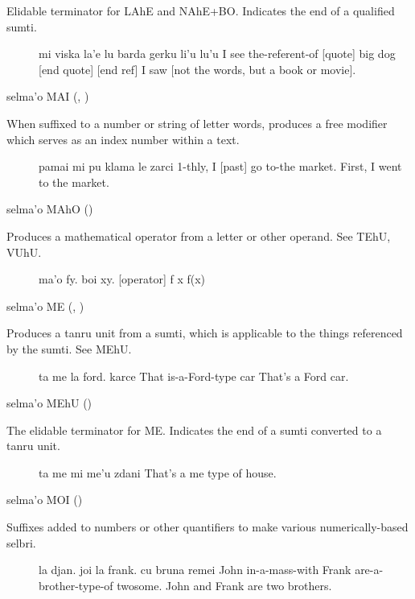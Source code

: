 Elidable terminator for LAhE and NAhE+BO. Indicates the end
    of a qualified sumti.
\begin{description}
\item[] mi viska la'e lu barda gerku li'u lu'u I see the-referent-of [quote] big dog [end quote] [end ref] I saw  [not the words, but a book or movie].
\end{description}

selma'o MAI (, ) 

When suffixed to a number or string of letter words,
    produces a free modifier which serves as an index number within
    a text.
\begin{description}
\item[] pamai mi pu klama le zarci 1-thly, I [past] go to-the market. First, I went to the market.
\end{description}

selma'o MAhO () 

Produces a mathematical operator from a letter or other
    operand. See TEhU, VUhU.
\begin{description}
\item[] ma'o fy. boi xy. [operator] f x f(x)
\end{description}

selma'o ME (, ) 

Produces a tanru unit from a sumti, which is applicable to
    the things referenced by the sumti. See MEhU.
\begin{description}
\item[] ta me la ford. karce That is-a-Ford-type car That's a Ford car.
\end{description}

selma'o MEhU () 

The elidable terminator for ME. Indicates the end of a sumti
    converted to a tanru unit.
\begin{description}
\item[] ta me mi me'u zdani That's a me type of house.
\end{description}

selma'o MOI () 

Suffixes added to numbers or other quantifiers to make
    various numerically-based selbri.
\begin{description}
\item[] la djan. joi la frank. cu bruna remei John in-a-mass-with Frank are-a-brother-type-of twosome. John and Frank are two brothers.
\end{description}

